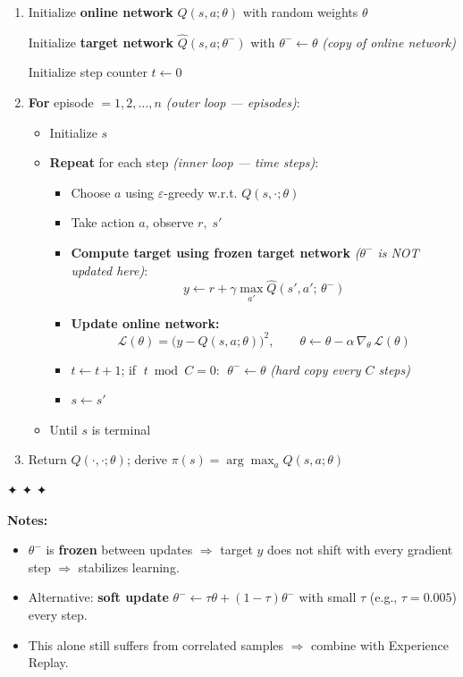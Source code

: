 \documentclass[11pt]{article}
\providecommand{\tightlist}{%
      \setlength{\itemsep}{0pt}\setlength{\parskip}{0pt}}
\begin{document}
\begin{enumerate}
\def\labelenumi{\arabic{enumi}.}
\item
  Initialize \textbf{online network} \(Q(s,a;\theta)\) with random
  weights \(\theta\)

  Initialize \textbf{target network} \(\hat{Q}(s,a;\theta^-)\) with
  \(\theta^- \leftarrow \theta\) \emph{(copy of online network)}

  Initialize step counter \(t \leftarrow 0\)
\item
  \textbf{For} episode \(= 1, 2, \ldots, n\) \emph{(outer loop ---
  episodes)}:

  \begin{itemize}
  \tightlist
  \item
    Initialize \(s\)
  \item
    \textbf{Repeat} for each step \emph{(inner loop --- time steps)}:

    \begin{itemize}
    \tightlist
    \item
      Choose \(a\) using \(\varepsilon\)-greedy w.r.t.
      \(Q(s,\cdot;\theta)\)
    \item
      Take action \(a\), observe \(r,\; s'\)
    \item
      \textbf{Compute target using frozen target network}
      \emph{(\(\theta^-\) is NOT updated here)}:
      \[y \leftarrow r + \gamma \max_{a'} \hat{Q}(s', a';\, \theta^-)\]
    \item
      \textbf{Update online network:}
      \[\mathcal{L}(\theta) = \bigl(y - Q(s,a;\theta)\bigr)^2, \qquad \theta \leftarrow \theta - \alpha\,\nabla_\theta\,\mathcal{L}(\theta)\]
    \item
      \(t \leftarrow t + 1\); if \(\;t \bmod C = 0\):
      \(\;\theta^- \leftarrow \theta\) \emph{(hard copy every \(C\)
      steps)}
    \item
      \(s \leftarrow s'\)
    \end{itemize}
  \item
    Until \(s\) is terminal
  \end{itemize}
\item
  Return \(Q(\cdot,\cdot;\theta)\); derive
  \(\pi(s) = \arg\max_a Q(s,a;\theta)\)
\end{enumerate}

✦ ✦ ✦

\textbf{Notes:}

\begin{itemize}
\tightlist
\item
  \(\theta^-\) is \textbf{frozen} between updates \(\Rightarrow\) target
  \(y\) does not shift with every gradient step \(\Rightarrow\)
  stabilizes learning.
\item
  Alternative: \textbf{soft update}
  \(\theta^- \leftarrow \tau\theta + (1-\tau)\theta^-\) with small
  \(\tau\) (e.g., \(\tau = 0.005\)) every step.
\item
  This alone still suffers from correlated samples \(\Rightarrow\)
  combine with Experience Replay.
\end{itemize}
\end{document}
